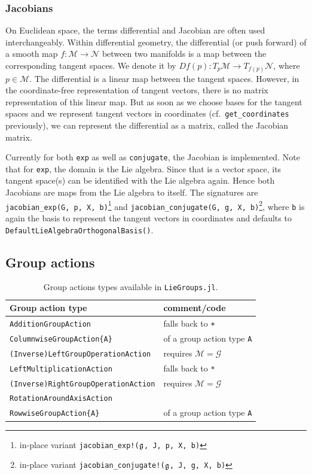 \documentclass{juliacon}
\begin{document}
\subsubsection*{Jacobians}
On Euclidean space, the terms differential and Jacobian are often used interchangeably. Within differential geometry, the differential (or push forward) of a smooth map $f\colon \mathcal M \to \mathcal N$ between two manifolds is a map between the corresponding tangent spaces. We denote it by $Df(p)\colon T_p\mathcal M \to T_{f(p)}\mathcal N$, where $p \in \mathcal M$.
The differential is a linear map between the tangent spaces.
However, in the coordinate-free representation of tangent vectors, there is no matrix representation of this linear map.
But as soon as we choose bases for the tangent spaces and we represent tangent vectors in coordinates (cf.~\verb|get_coordinates| previously), we can represent the differential as a matrix, called the Jacobian matrix.

Currently for both \verb|exp| as well as \verb|conjugate|, the Jacobian is implemented. Note that for \verb|exp|, the domain is the Lie algebra. Since that is a vector space, its tangent space(s) can be identified with the Lie algebra again. Hence both Jacobians are maps from the Lie algebra to itself. The signatures are
\verb|jacobian_exp(G, p, X, b)|\footnote{in-place variant \texttt{jacobian\_exp!($\frak g$, J, p, X, b)}} and \verb|jacobian_conjugate(G, g, X, b)|\footnote{in-place variant \texttt{jacobian\_conjugate!($\frak g$, J, g, X, b)}}, where \verb|b| is again the basis to represent the tangent vectors in coordinates and defaults to \verb|DefaultLieAlgebraOrthogonalBasis()|.

\subsection{Group actions}

\begin{table}
    \centering
    \caption{Group actions types available in \texttt{LieGroups.jl}.}
    \begin{tabular}{@{}ll@{}}
        \toprule
        \textbf{Group action type} & comment/code\\
        \midrule
        \verb|AdditionGroupAction| & falls back to \verb|+|\\
        \verb|ColumnwiseGroupAction{A}| & of a group action type \verb|A|\\
        \verb|(Inverse)LeftGroupOperationAction| & requires $\mathcal M = \mathcal G$\\
        \verb|LeftMultiplicationAction| & falls back to \verb|*|\\
        \verb|(Inverse)RightGroupOperationAction| & requires $\mathcal M = \mathcal G$\\
        \verb|RotationAroundAxisAction| & \\
        \verb|RowwiseGroupAction{A}| & of a group action type \verb|A|\\
        \bottomrule
    \end{tabular}
    \label{tab:GroupActionTypes}
\end{table}
\end{document}
